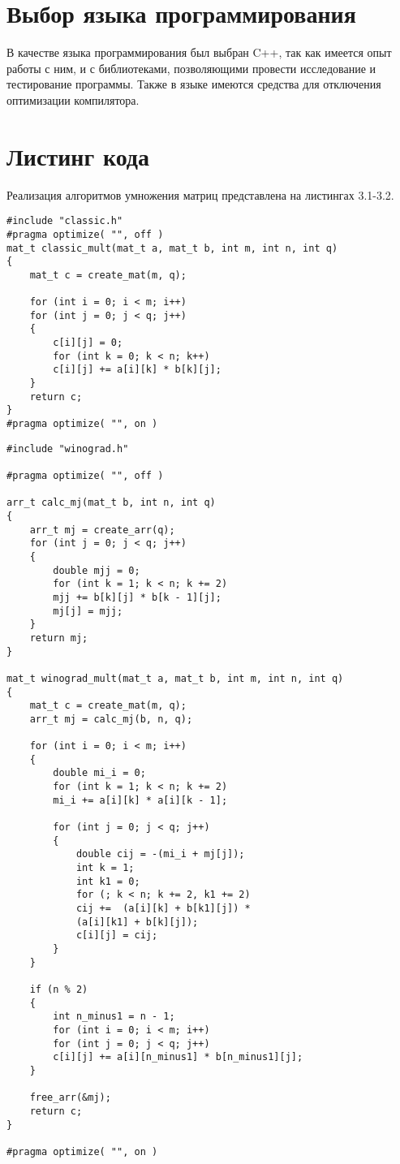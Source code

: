 \section{Выбор языка программирования}
В качестве языка программирования был выбран C++, так как имеется опыт работы с ним, и с библиотеками, позволяющими провести исследование и тестирование программы. Также в языке имеются средства для отключения оптимизации компилятора.


\section{Листинг кода}
Реализация алгоритмов умножения матриц представлена на листингах 3.1-3.2.

\begin{lstlisting}[caption = Функция умножения матриц классическим алгоритмом.]
#include "classic.h"
#pragma optimize( "", off )
mat_t classic_mult(mat_t a, mat_t b, int m, int n, int q)
{
	mat_t c = create_mat(m, q);
	
	for (int i = 0; i < m; i++)
	for (int j = 0; j < q; j++)
	{
		c[i][j] = 0;
		for (int k = 0; k < n; k++)
		c[i][j] += a[i][k] * b[k][j];
	}
	return c;
}
#pragma optimize( "", on )
\end{lstlisting}

\begin{lstlisting}[caption = Функция умножения матриц алгоритмом Винограда.]
#include "winograd.h"

#pragma optimize( "", off )

arr_t calc_mj(mat_t b, int n, int q)
{
	arr_t mj = create_arr(q);
	for (int j = 0; j < q; j++)
	{
		double mjj = 0; 
		for (int k = 1; k < n; k += 2)
		mjj += b[k][j] * b[k - 1][j];
		mj[j] = mjj;
	}
	return mj;
}

mat_t winograd_mult(mat_t a, mat_t b, int m, int n, int q)
{
	mat_t c = create_mat(m, q);
	arr_t mj = calc_mj(b, n, q);
	
	for (int i = 0; i < m; i++)
	{
		double mi_i = 0;
		for (int k = 1; k < n; k += 2)
		mi_i += a[i][k] * a[i][k - 1];
		
		for (int j = 0; j < q; j++)
		{
			double cij = -(mi_i + mj[j]);
			int k = 1;
			int k1 = 0;
			for (; k < n; k += 2, k1 += 2)
			cij +=	(a[i][k] + b[k1][j]) *
			(a[i][k1] + b[k][j]);
			c[i][j] = cij;
		}
	}
	
	if (n % 2)
	{
		int n_minus1 = n - 1;
		for (int i = 0; i < m; i++)
		for (int j = 0; j < q; j++)
		c[i][j] += a[i][n_minus1] * b[n_minus1][j];
	}
	
	free_arr(&mj);
	return c;
}

#pragma optimize( "", on )
\end{lstlisting}


